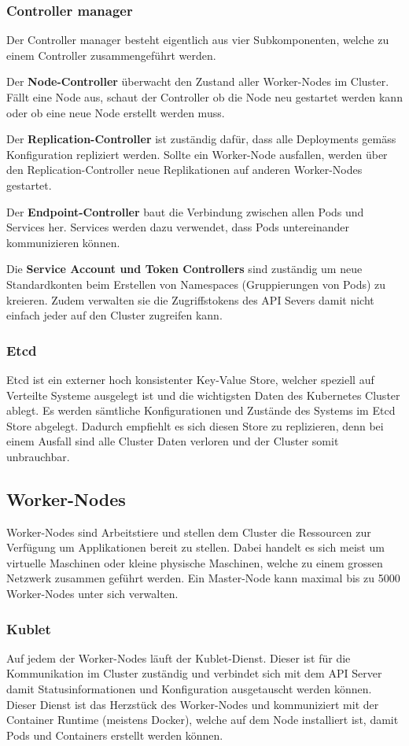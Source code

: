 \subsubsection{Controller manager}
Der Controller manager besteht eigentlich aus vier Subkomponenten, welche zu einem Controller zusammengeführt werden. 

Der \textbf{Node-Controller} überwacht den Zustand aller Worker-Nodes im Cluster. Fällt eine Node aus, schaut der Controller ob die Node neu gestartet werden kann oder ob eine neue Node erstellt werden muss.

Der \textbf{Replication-Controller} ist zuständig dafür, dass alle Deployments gemäss Konfiguration repliziert werden. Sollte ein Worker-Node ausfallen, werden über den Replication-Controller neue Replikationen auf anderen Worker-Nodes gestartet.

Der \textbf{Endpoint-Controller} baut die Verbindung zwischen allen Pods und Services her. Services werden dazu verwendet, dass Pods untereinander kommunizieren können.

Die \textbf{Service Account und Token Controllers} sind zuständig um neue Standardkonten beim Erstellen von Namespaces (Gruppierungen von Pods) zu kreieren. Zudem verwalten sie die Zugriffstokens des API Severs damit nicht einfach jeder auf den Cluster zugreifen kann. \cite{kubernetes}
\subsubsection{Etcd}
Etcd ist ein externer hoch konsistenter Key-Value Store, welcher speziell auf Verteilte Systeme ausgelegt ist und die wichtigsten Daten des Kubernetes Cluster ablegt. Es werden sämtliche Konfigurationen und Zustände des Systems im Etcd Store abgelegt. Dadurch empfiehlt es sich diesen Store zu replizieren, denn bei einem Ausfall sind alle Cluster Daten verloren und der Cluster somit unbrauchbar. \cite{kubernetes}

\subsection{Worker-Nodes}
Worker-Nodes sind Arbeitstiere und stellen dem Cluster die Ressourcen zur Verfügung um Applikationen bereit zu stellen. Dabei handelt es sich meist um virtuelle Maschinen oder kleine physische Maschinen, welche zu einem grossen Netzwerk zusammen geführt werden. Ein Master-Node kann maximal bis zu 5000 Worker-Nodes unter sich verwalten. \cite{kubernetes}
\subsubsection{Kublet}
Auf jedem der Worker-Nodes läuft der Kublet-Dienst. Dieser ist für die Kommunikation im Cluster zuständig und verbindet sich mit dem API Server damit Statusinformationen und Konfiguration ausgetauscht werden können. Dieser Dienst ist das Herzstück des Worker-Nodes und kommuniziert mit der Container Runtime (meistens Docker), welche auf dem Node installiert ist, damit Pods und Containers erstellt werden können. \cite{kubernetes}

